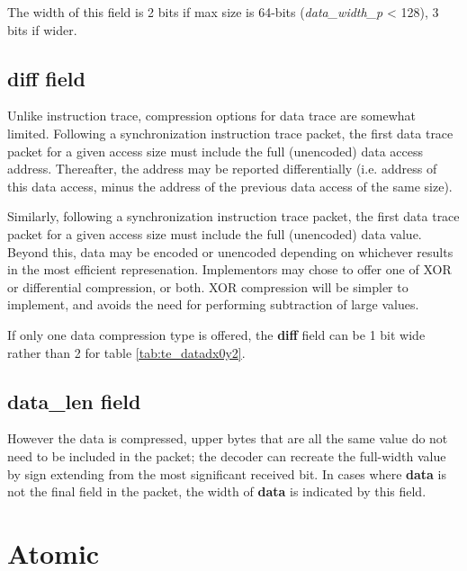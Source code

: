 The width of this field is 2 bits if max size is 64-bits (\textit{data\_width\_p} < 128), 3 bits if wider.

\subsection{diff field} \label{sec:loadstore-diff}

Unlike instruction trace, compression options for data trace are somewhat limited.
Following a synchronization instruction trace packet, the first data trace packet for a given access size must 
include the full (unencoded) data access address.  Thereafter, the address may be reported differentially (i.e. 
address of this data access, minus the address of the previous data access of the same size). 

Similarly, following a synchronization instruction trace packet, the first data trace packet for a given access size 
must include the full (unencoded) data value.  Beyond this, data may be encoded or unencoded depending on whichever
results in the most efficient represenation.  Implementors may chose to offer one of XOR or differential compression,
or both.  XOR compression will be simpler to implement, and avoids the need for performing subtraction of large 
values.

If only one data compression type is offered, the \textbf{diff} field can be 1 bit wide rather than 2 for table \ref{tab:te_datadx0y2}.

\subsection{data\_len field} \label{sec:loadstore-datalen}

However the data is compressed, upper bytes that are all the same value do not need to be 
included in the packet; the decoder can recreate the full-width value by sign extending from the most significant 
received bit.  In cases where \textbf{data} is not the final field in the packet, the width of \textbf{data} is 
indicated by this field.

\FloatBarrier
\section{Atomic} \label{sec:data-atomic}

